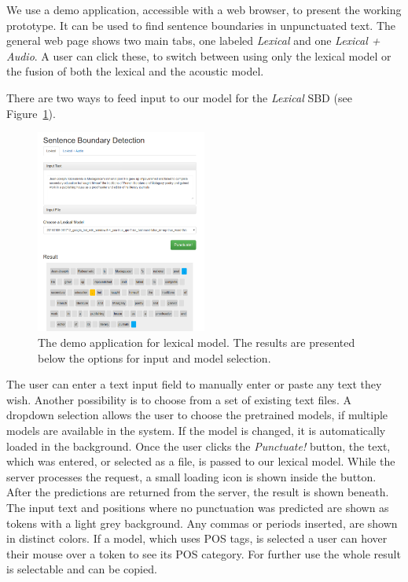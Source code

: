We use a demo application, accessible with a web browser, to present the working prototype.
It can be used to find sentence boundaries in unpunctuated text.
The general web page shows two main tabs, one labeled \emph{Lexical} and one \emph{Lexical + Audio}.
A user can click these, to switch between using only the lexical model or the fusion of both the lexical and the acoustic model.

There are two ways to feed input to our model for the \emph{Lexical} SBD (see Figure~\ref{fig:demo_l}).
\begin{figure}[ht]
    \centering
    \includegraphics[width=0.5\textwidth]{img/demo_l.png}
    \caption{The demo application for lexical model. The results are presented below the options for input and model selection.}
    \label{fig:demo_l}
\end{figure}
The user can enter a text input field to manually enter or paste any text they wish.
Another possibility is to choose from a set of existing text files.
A dropdown selection allows the user to choose the pretrained models, if multiple models are available in the system.
If the model is changed, it is automatically loaded in the background.
Once the user clicks the \emph{Punctuate!} button, the text, which was entered, or selected as a file, is passed to our lexical model.
While the server processes the request, a small loading icon is shown inside the button.
After the predictions are returned from the server, the result is shown beneath.
The input text and positions where no punctuation was predicted are shown as tokens with a light grey background.
Any commas or periods inserted, are shown in distinct colors.
If a model, which uses POS tags, is selected a user can hover their mouse over a token to see its POS category.
For further use the whole result is selectable and can be copied.

